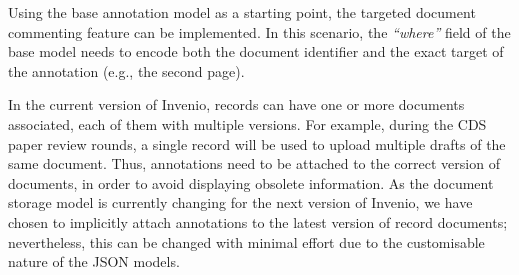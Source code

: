 
Using the base annotation model as a starting point, the targeted document
commenting feature can be implemented. In this scenario, the \textit{``where''}
field of the base model needs to encode both the document identifier and the
exact target of the annotation (e.g., the second page).

In the current version of Invenio, records can have one or more documents
associated, each of them with multiple versions. For example, during the CDS
paper review rounds, a single record will be used to upload multiple drafts of
the same document. Thus, annotations need to be attached to the correct version
of documents, in order to avoid displaying obsolete information. As the document
storage model is currently changing for the next version of Invenio, we have
chosen to implicitly attach annotations to the latest version of record
documents; nevertheless, this can be changed with minimal effort due to the
customisable nature of the JSON models.

